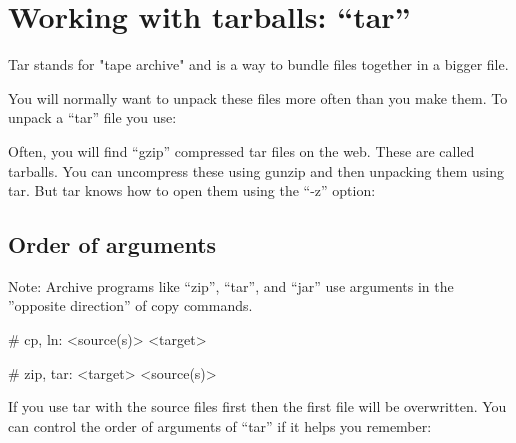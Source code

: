 \section{Working with tarballs: ``tar''}

Tar stands for "tape archive" and is a way to bundle files together in a bigger
file.

You will normally want to unpack these files more often than you make them. To
unpack a ``tar'' file you use:

\begin{prompt}
\end{prompt}

Often, you will find ``gzip'' compressed tar files on the web. These are called
tarballs. You can uncompress these using gunzip and then unpacking them using
tar. But tar knows how to open them using the ``-z'' option:

\begin{prompt}
\end{prompt}

\subsection{Order of arguments}

Note: Archive programs like ``zip'', ``tar'', and ``jar'' use arguments in the
''opposite direction'' of copy commands. 

\begin{prompt}
    # cp, ln: <source(s)> <target>
    
    # zip, tar: <target> <source(s)>
\end{prompt}

If you use tar with the source files first then the first file will be
overwritten. You can control the order of arguments of ``tar'' if it helps you
remember:

\begin{prompt}
\end{prompt}
